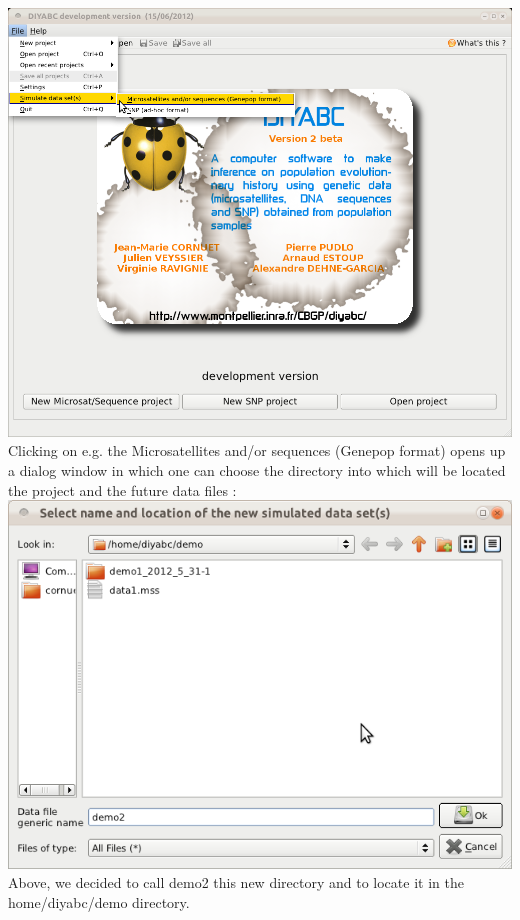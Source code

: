 \includegraphics[scale=0.33]{gui_pictures/Capture-DIYABC-62.png} \\

Clicking on e.g. the \textsf{Microsatellites and/or sequences (Genepop format)} opens up a dialog window in which one can choose the directory into which will be located the project and the future data files :\\

\includegraphics[scale=0.33]{gui_pictures/Capture-DIYABC-64.png} \\

Above, we decided to call \textsf{demo2} this new directory and to locate it in the \textsf{home/diyabc/demo} directory.

